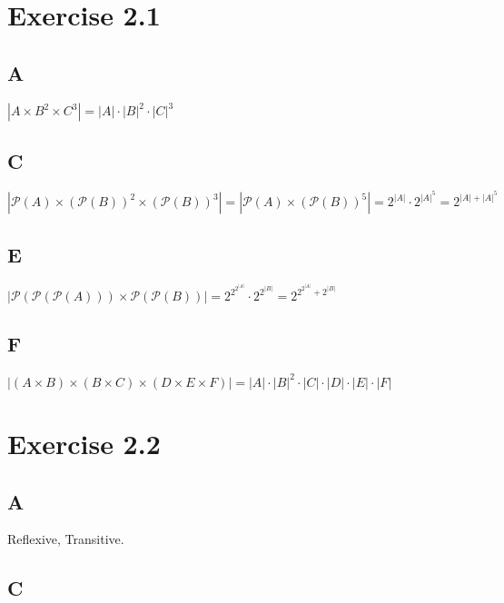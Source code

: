 \documentclass[12pt]{article}
\begin{document}
\maketitle

\section{Exercise 2.1}

\subsection{A}

$ |A \times B^2 \times C^3| = |A| \cdot |B|^2 \cdot |C|^3 $ 

\subsection{C}

$ |\mathcal{P}(A) \times (\mathcal{P}(B))^2 \times (\mathcal{P}(B))^3| = |\mathcal{P}(A) \times (\mathcal{P}(B))^5| = 2^{|A|} \cdot 2^{|A|^5} = 2^{|A| + |A|^5} $

\subsection{E}

$ |\mathcal{P}(\mathcal{P}(\mathcal{P}(A))) \times \mathcal{P}(\mathcal{P}(B))| = 2^{2^{2^{|A|}}} \cdot 2^{2^{|B|}} = 2^{2^{2^{|A|}} + 2^{|B|}} $

\subsection{F}

$ |(A \times B) \times (B \times C) \times (D \times E \times F)| = |A| \cdot |B|^2 \cdot |C| \cdot |D| \cdot |E| \cdot |F| $ 

\section{Exercise 2.2}

\subsection{A}

Reflexive, Transitive.

\subsection{C}
\end{document}

